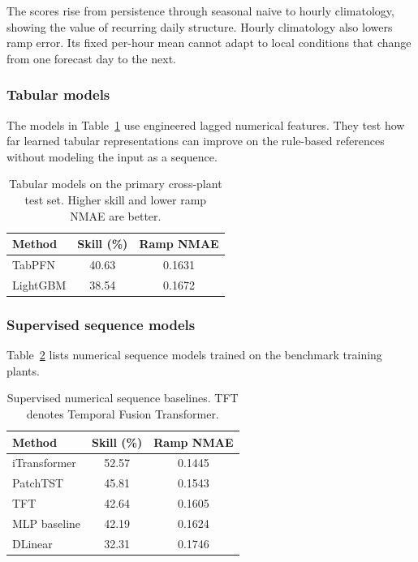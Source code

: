 The scores rise from persistence through seasonal naive to hourly climatology, showing the value of recurring daily structure. Hourly climatology also lowers ramp error. Its fixed per-hour mean cannot adapt to local conditions that change from one forecast day to the next.

\subsubsection{Tabular models}

The models in Table~\ref{tab:results-tabular} use engineered lagged numerical features. They test how far learned tabular representations can improve on the rule-based references without modeling the input as a sequence.

\begin{table}[htbp]\centering
\begin{tabular}{lcc}\hline
Method & Skill (\%) & Ramp NMAE \\\hline
TabPFN & 40.63 & 0.1631 \\
LightGBM & 38.54 & 0.1672 \\\hline
\end{tabular}
\caption{Tabular models on the primary cross-plant test set. Higher skill and lower ramp NMAE are better.}\label{tab:results-tabular}
\end{table}

\subsubsection{Supervised sequence models}

Table~\ref{tab:results-supervised} lists numerical sequence models trained on the benchmark training plants.

\begin{table}[htbp]\centering
\begin{tabular}{lcc}\hline
Method & Skill (\%) & Ramp NMAE \\\hline
iTransformer & 52.57 & 0.1445 \\
PatchTST & 45.81 & 0.1543 \\
TFT & 42.64 & 0.1605 \\
MLP baseline & 42.19 & 0.1624 \\
DLinear & 32.31 & 0.1746 \\\hline
\end{tabular}
\caption{Supervised numerical sequence baselines. TFT denotes Temporal Fusion Transformer.}\label{tab:results-supervised}
\end{table}

